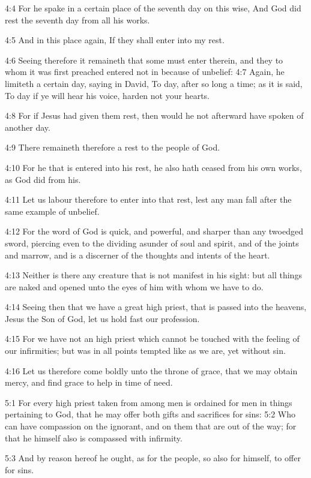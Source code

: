 4:4 For he spake in a certain place of the seventh day on this wise,
And God did rest the seventh day from all his works.

4:5 And in this place again, If they shall enter into my rest.

4:6 Seeing therefore it remaineth that some must enter therein, and
they to whom it was first preached entered not in because of unbelief:
4:7 Again, he limiteth a certain day, saying in David, To day, after
so long a time; as it is said, To day if ye will hear his voice,
harden not your hearts.

4:8 For if Jesus had given them rest, then would he not afterward have
spoken of another day.

4:9 There remaineth therefore a rest to the people of God.

4:10 For he that is entered into his rest, he also hath ceased from
his own works, as God did from his.

4:11 Let us labour therefore to enter into that rest, lest any man
fall after the same example of unbelief.

4:12 For the word of God is quick, and powerful, and sharper than any
twoedged sword, piercing even to the dividing asunder of soul and
spirit, and of the joints and marrow, and is a discerner of the
thoughts and intents of the heart.

4:13 Neither is there any creature that is not manifest in his sight:
but all things are naked and opened unto the eyes of him with whom we
have to do.

4:14 Seeing then that we have a great high priest, that is passed into
the heavens, Jesus the Son of God, let us hold fast our profession.

4:15 For we have not an high priest which cannot be touched with the
feeling of our infirmities; but was in all points tempted like as we
are, yet without sin.

4:16 Let us therefore come boldly unto the throne of grace, that we
may obtain mercy, and find grace to help in time of need.

5:1 For every high priest taken from among men is ordained for men in
things pertaining to God, that he may offer both gifts and sacrifices
for sins: 5:2 Who can have compassion on the ignorant, and on them
that are out of the way; for that he himself also is compassed with
infirmity.

5:3 And by reason hereof he ought, as for the people, so also for
himself, to offer for sins.

